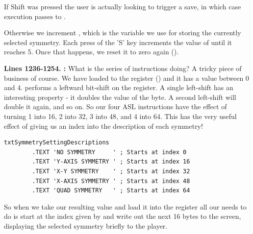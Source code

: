 If Shift was pressed the user is actually looking to trigger a save, in which case execution passes to .

Otherwise we increment , which is the variable we use for storing the currently selected symmetry.
Each press of the 'S' key increments the value of  until it reaches 5. Once that happens, we 
reset it to zero again ().

\textbf{Lines 1236-1254. :} What is the series of  instructions doing? A tricky
piece of business of course. We have loaded  to the  register () and it has a value between 0 and 4.
 performs a leftward bit-shift on the  register. A single left-shift has an interesting property - it doubles the
value of the byte. A second left-shift will double it again, and so on. So our four {ASL} instructions have the effect of turning 1 into
16, 2 into 32, 3 into 48, and 4 into 64. This has the very useful effect of giving us an index into the description of each symmetry!

\begin{lstlisting}[escapechar=\%]
txtSymmetrySettingDescriptions 
        .TEXT 'NO SYMMETRY     ' ; Starts at index 0
        .TEXT 'Y-AXIS SYMMETRY ' ; Starts at index 16
        .TEXT 'X-Y SYMMETRY    ' ; Starts at index 32
        .TEXT 'X-AXIS SYMMETRY ' ; Starts at index 48
        .TEXT 'QUAD SYMMETRY   ' ; Starts at index 64
\end{lstlisting}

So when we take our resulting value and load it into the  register all our  needs to do is start at the 
index given by  and write out the next 16 bytes to the screen, displaying the selected symmetry briefly to the player.


